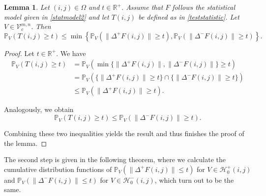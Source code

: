 \documentclass[a4paper,12pt]{article}
\newcommand{\norm}[1]{\lVert#1\rVert}
\theoremstyle{plain}
\newtheorem{lemma}[theorem]{Lemma}
\theoremstyle{definition}
\begin{document}
\begin{lemma}\label{lem: typeIbound}
	Let $(i, j) \in \Omega$ and $t \in \mathbb{R}^+$. Assume that $F$ follows the statistical model given in \eqref{statmodel2} and let $T(i, j)$ be defined as in \eqref{teststatistic}. Let $V \in \mathcal{V}_c^{m, n}$. Then
	\begin{equation}
		\mathbb{P}_V( T(i, j) \geq t ) \leq \min \left\{ \mathbb{P}_V( \norm{\Delta^+ F(i, j)} \geq t ), \mathbb{P}_V( \norm{\Delta^- F(i, j)} \geq t ) \right\}.
	\end{equation}
\end{lemma}
\begin{proof}
	Let $t \in \mathbb{R}^+$. We have
	\begin{align*}
		\mathbb{P}_V( T(i, j) \geq t ) &= \mathbb{P}_V( \min \{ \norm{\Delta^+ F(i, j)}, \norm{\Delta^- F(i, j)} \} \geq t ) \\
		&= \mathbb{P}_V( \{ \norm{\Delta^+ F(i, j)} \geq t \} \cap \{ \norm{\Delta^- F(i, j)} \geq t \} ) \\
		&\leq \mathbb{P}_V( \norm{\Delta^+ F(i, j)} \geq t ).
	\end{align*}
	
	Analogously, we obtain
	\begin{equation*}
		\mathbb{P}_V( T(i, j) \geq t ) \leq \mathbb{P}_V( \norm{\Delta^- F(i, j)} \geq t ).
	\end{equation*}
	
	Combining these two inequalities yields the result and thus finishes the proof of the lemma.
\end{proof}

The second step is given in the following theorem, where we calculate the cumulative distribution functions of $\mathbb{P}_V( \norm{\Delta^+ F(i, j)} \leq t )$ for $V \in \mathcal{H}_0^+(i, j)$ and $\mathbb{P}_V( \norm{\Delta^- F(i, j)} \leq t )$ for $V \in \mathcal{H}_0^-(i, j)$, which turn out to be the same.
\end{document}
